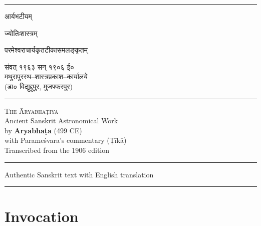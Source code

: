 \documentclass[11pt,a4paper]{article}
\begin{document}
\thispagestyle{empty}
\begin{center}
\vspace*{1cm}

{\color{rulecolor}\rule{0.8\textwidth}{1pt}}
\vspace{0.5cm}

{\fontsize{36}{44}\selectfont\devanagarifont\color{titlecolor}
आर्यभटीयम्}

\vspace{0.3cm}
{\Large\devanagarifont ज्योतिःशास्त्रम्}

\vspace{0.2cm}
{\large\devanagarifont परमेश्वराचार्यकृतटीकासमलङ्कृतम्}

\vspace{0.8cm}
{\normalsize\devanagarifont
संवत् १९६३ सन् १९०६ ई०\\[0.3em]
मथुरापुरस्थ--शास्त्रप्रकाश--कार्यालये\\
(डा० विद्युद्दूपुर, मुजफ्फरपुर)}

\vspace{1cm}
{\color{rulecolor}\rule{0.5\textwidth}{0.5pt}}
\vspace{0.8cm}

{\LARGE\scshape\color{titlecolor} The Āryabhaṭīya}\\[0.4em]
{\large Ancient Sanskrit Astronomical Work}\\[0.4em]
{\normalsize by \textbf{Āryabhaṭa} (499 CE)}\\[0.2em]
{\small with Parameśvara's commentary (Ṭīkā)}\\[0.2em]
{\small Transcribed from the 1906 edition}

\vspace{0.5cm}
{\color{rulecolor}\rule{0.5\textwidth}{0.5pt}}

\vspace{0.3cm}
{\small Authentic Sanskrit text with English translation}

\vspace{0.5cm}
{\color{rulecolor}\rule{0.8\textwidth}{1pt}}

\end{center}
\clearpage

\section*{Invocation}
\end{document}
